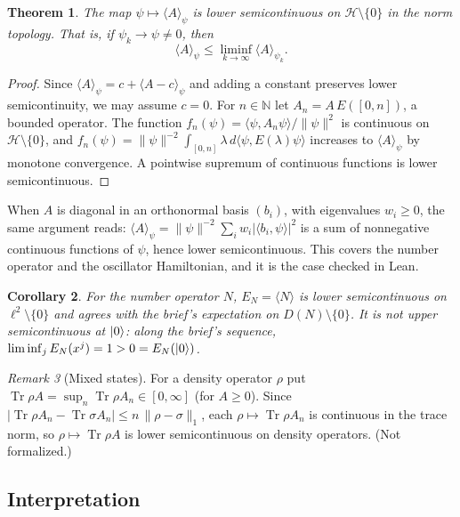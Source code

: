 \documentclass[11pt]{article}
\newtheorem{theorem}{Theorem}[section]
\newtheorem{corollary}[theorem]{Corollary}
\theoremstyle{remark}
\newtheorem{remark}[theorem]{Remark}
\newcommand{\Hil}{\mathcal H}
\newcommand{\ip}[2]{\langle #1, #2\rangle}
\begin{document}
\begin{theorem}\label{thm:lsc}
  The map $\psi \mapsto \langle A\rangle_\psi$ is lower semicontinuous on $\Hil\setminus\{0\}$
  in the norm topology. That is, if $\psi_k \to \psi \ne 0$, then
  \[
    \langle A\rangle_\psi \le \liminf_{k\to\infty} \langle A\rangle_{\psi_k}.
  \]
\end{theorem}

\begin{proof}
  Since $\langle A\rangle_\psi = c + \langle A - c\rangle_\psi$ and adding a constant preserves
  lower semicontinuity, we may assume $c = 0$. For $n \in \mathbb N$ let
  $A_n = A\,E([0,n])$, a bounded operator. The function
  $f_n(\psi) = \ip{\psi}{A_n\psi}/\|\psi\|^2$ is continuous on $\Hil\setminus\{0\}$, and
  $f_n(\psi) = \|\psi\|^{-2}\int_{[0,n]}\lambda\,d\ip{\psi}{E(\lambda)\psi}$ increases to
  $\langle A\rangle_\psi$ by monotone convergence. A pointwise supremum of continuous functions
  is lower semicontinuous.
\end{proof}

When $A$ is diagonal in an orthonormal basis $(b_i)$, with eigenvalues $w_i \ge 0$, the same
argument reads: $\langle A\rangle_\psi = \|\psi\|^{-2}\sum_i w_i |\ip{b_i}{\psi}|^2$ is a sum of
nonnegative continuous functions of $\psi$, hence lower semicontinuous. This covers the number
operator and the oscillator Hamiltonian, and it is the case checked in Lean.

\begin{corollary}\label{cor:number}
  For the number operator $N$, $E_N = \langle N\rangle$ is lower semicontinuous on
  $\ell^2\setminus\{0\}$ and agrees with the brief's expectation on $D(N)\setminus\{0\}$. It is not
  upper semicontinuous at $\ket{0}$: along the brief's sequence,
  $\liminf_j E_N(x^j) = 1 > 0 = E_N(\ket{0})$.
\end{corollary}

\begin{remark}[Mixed states]
  For a density operator $\rho$ put $\operatorname{Tr}\rho A = \sup_n \operatorname{Tr}\rho A_n
  \in [0,\infty]$ (for $A \ge 0$). Since $|\operatorname{Tr}\rho A_n - \operatorname{Tr}\sigma A_n|
  \le n\,\|\rho - \sigma\|_1$, each $\rho \mapsto \operatorname{Tr}\rho A_n$ is continuous in the
  trace norm, so $\rho \mapsto \operatorname{Tr}\rho A$ is lower semicontinuous on density
  operators. (Not formalized.)
\end{remark}

\subsection{Interpretation}
\end{document}
